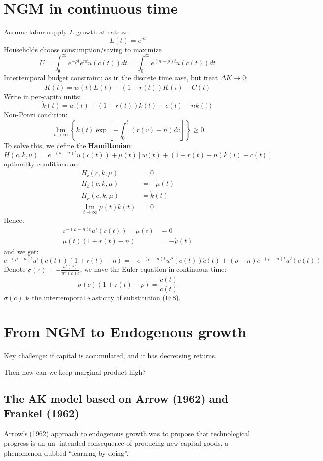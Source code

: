 \section{NGM in continuous time}

Assume labor supply $L$ growth at rate $n$:
\[ L(t) = e^{nt} \]
Households choose consumption/saving to maximize
\[ U = \int_0^{\infty} e^{-\rho t}e^{nt}u(c(t))dt = \int_0^{\infty} e^{(n-\rho)t}u(c(t))dt \]
Intertemporal budget constraint: as in the discrete time case, but treat $\Delta K \to 0$:
\[ \dot{K}(t) = w(t)L(t) + (1 + r(t))K(t) - C(t) \]
Write in per-capita units:
\[ \dot{k}(t) = w(t) + (1 + r(t))k(t) - c(t) - nk(t) \]
Non-Ponzi condition:
\[ \lim_{t \to \infty} \left\{k(t)\exp\left[-\int_0^t(r(v) - n)dv\right]\right\} \geq 0 \]
To solve this, we define the \textbf{Hamiltonian}:
\[ H(c, k, \mu) = e^{-(\rho - n)t}u(c(t)) + \mu(t)[w(t) + (1 + r(t) - n)k(t) - c(t)] \]
optimality conditions are
\begin{align*}
    H_c(c, k, \mu) &= 0 \\
    H_k(c, k, \mu) &= -\dot{\mu}(t) \\
    H_{\mu}(c, k, \mu) &= \dot{k}(t) \\
    \lim_{t \to \infty} \mu(t)k(t) &= 0
\end{align*}
Hence:
\begin{align*}
    e^{-(\rho - n)t}u'(c(t)) - \mu(t) &= 0 \\
    \mu(t)(1 + r(t) - n) &= -\dot{\mu}(t)
\end{align*}
and we get:
\[ e^{-(\rho - n)t}u'(c(t))(1 + r(t) - n) = -e^{-(\rho - n)t}u''(c(t))\dot{c}(t) + (\rho - n)e^{-(\rho - n)t}u'(c(t)) \]
Denote $\sigma(c) = -\frac{u'(c)}{u''(c)c}$, we have the Euler equation in continuous time:
\[ \sigma(c)(1 + r(t) - \rho) = \frac{\dot{c}(t)}{c(t)} \]
$\sigma(c)$ is the intertemporal elasticity of substitution (IES).

\section{From NGM to Endogenous growth}

Key challenge: if capital is accumulated, and it has decreasing
returns.

Then how can we keep marginal product high?

\subsection{The AK model based on Arrow (1962) and Frankel (1962)}
Arrow’s (1962) approach to endogenous growth was to propose that technological progress is an un-
intended consequence of producing new capital goods, a phenomenon dubbed “learning by doing”.


